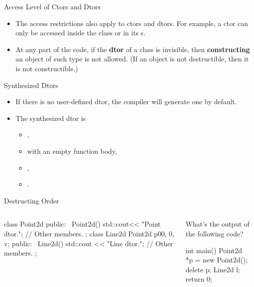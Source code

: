 \documentclass{beamer}
\begin{document}
\begin{frame}{Access Level of Ctors and Dtors}
    \begin{itemize}
        \item The access restrictions also apply to ctors and dtors. For example, a  ctor can only be accessed inside the class or in its s.
        \item At any part of the code, if the \textbf{dtor} of a class is invisible, then \textbf{constructing} an object of such type is not allowed. (If an object is not destructible, then it is not constructible.)
    \end{itemize}
\end{frame}

\begin{frame}{Synthesized Dtors}
    \begin{itemize}
        \item If there is no user-defined dtor, the compiler will generate one by default.
        \item The synthesized dtor is
        \begin{itemize}
            \item {},
            \item with an empty function body,
            \item {},
            \item {}.
        \end{itemize}
    \end{itemize}
\end{frame}

\begin{frame}[fragile]{Destructing Order}
    \begin{columns}
        \begin{column}{0.5\linewidth}
            \begin{cpp}
class Point2d {
 public:
  ~Point2d() {
    std::cout<< "Point dtor.\n";
  }
  // Other members.
};
class Line2d {
  Point2d p0{0, 0}, v; 
 public:
  ~Line2d() {
    std::cout << "Line dtor.\n";
  }
  // Other members.
};
            \end{cpp}
        \end{column}
        \begin{column}{0.5\linewidth}
            What's the output of the following code?
            \begin{cpp}
int main() {
  Point2d *p = new Point2d();
  delete p;
  Line2d l;
  return 0;
}
            \end{cpp}
            \pause
            \\
            \\
            \\
        \end{column}
    \end{columns}
\end{frame}
\end{document}
